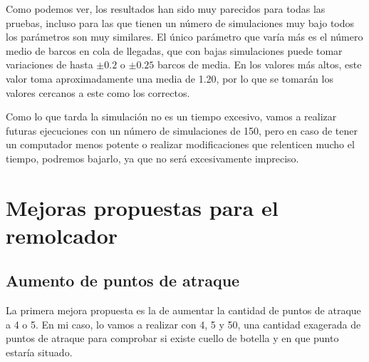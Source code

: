 \documentclass[11pt,a4paper]{report}
\begin{document}
Como podemos ver, los resultados han sido muy parecidos para todas las pruebas, incluso para las que tienen un número de simulaciones muy bajo todos los parámetros
son muy similares. El único parámetro que varía más es el número medio de barcos en cola de llegadas, que con bajas simulaciones puede tomar variaciones de hasta
$\pm0.2$ o $\pm0.25$ barcos de media. En los valores más altos, este valor toma aproximadamente una media de 1.20, por lo que se tomarán los valores cercanos a
este como los correctos.

Como lo que tarda la simulación no es un tiempo excesivo, vamos a realizar futuras ejecuciones con un número de simulaciones de 150, pero en caso de tener un
computador menos potente o realizar modificaciones que relenticen mucho el tiempo, podremos bajarlo, ya que no será excesivamente impreciso.


\section{Mejoras propuestas para el remolcador}

\subsection{Aumento de puntos de atraque}

La primera mejora propuesta es la de aumentar la cantidad de puntos de atraque a 4 o 5. En mi caso, lo vamos a realizar con 4, 5 y 50, una cantidad exagerada de
puntos de atraque para comprobar si existe cuello de botella y en que punto estaría situado.
\end{document}
